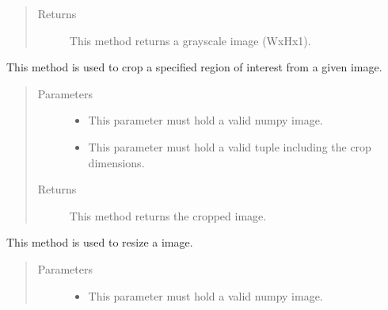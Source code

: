 \documentclass[letterpaper,10pt,english,openany,oneside]{sphinxmanual}
\begin{document}
\begin{fulllineitems}
\begin{fulllineitems}
\begin{quote}
\begin{description}
\item[{Returns}] \leavevmode
This method returns a grayscale image (WxHx1).

\end{description}\end{quote}

\end{fulllineitems}


\begin{fulllineitems}
\label{\detokenize{PreProcessing:cmc.PreProcessing.PreProcessing.crop}}
This method is used to crop a specified region of interest from a given image.
\begin{quote}\begin{description}
\item[{Parameters}] \leavevmode\begin{itemize}
\item {} 
 \textendash{} This parameter must hold a valid numpy image.

\item {} 
 \textendash{} This parameter must hold a valid tuple including the crop dimensions.

\end{itemize}

\item[{Returns}] \leavevmode
This method returns the cropped image.

\end{description}\end{quote}

\end{fulllineitems}


\begin{fulllineitems}
\label{\detokenize{PreProcessing:cmc.PreProcessing.PreProcessing.resize}}
This method is used to resize a image.
\begin{quote}\begin{description}
\item[{Parameters}] \leavevmode\begin{itemize}
\item {} 
 \textendash{} This parameter must hold a valid numpy image.


\end{itemize}
\end{description}
\end{quote}
\end{fulllineitems}
\end{fulllineitems}
\end{document}

